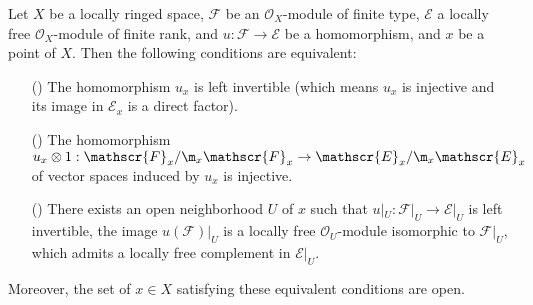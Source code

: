 \begin{proposition}\label{sheaf of module homomorphism ft to local free prop}
Let $X$ be a locally ringed space, $\mathscr{F}$ be an $\mathscr{O}_X$-module of finite type, $\mathscr{E}$ a locally free $\mathscr{O}_X$-module of finite rank, and $u:\mathscr{F}\to\mathscr{E}$ be a homomorphism, and $x$ be a point of $X$. Then the following conditions are equivalent:
\begin{itemize}
\item[(\rmnum{1})] The homomorphism $u_x$ is left invertible (which means $u_x$ is injective and its image in $\mathscr{E}_x$ is a direct factor). 
\item[(\rmnum{2})] The homomorphism $u_x\otimes 1:\mathscr{F}_x/\m_x\mathscr{F}_x\to\mathscr{E}_x/\m_x\mathscr{E}_x$ of vector spaces induced by $u_x$ is injective.
\item[(\rmnum{3})] There exists an open neighborhood $U$ of $x$ such that $u|_U:\mathscr{F}|_U\to\mathscr{E}|_U$ is left invertible, the image $u(\mathscr{F})|_U$ is a locally free $\mathscr{O}_U$-module isomorphic to $\mathscr{F}|_U$, which admits a locally free complement in $\mathscr{E}|_U$.
\end{itemize}
Moreover, the set of $x\in X$ satisfying these equivalent conditions are open.
\end{proposition}
